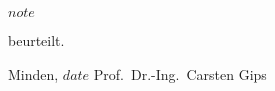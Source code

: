 
\parindent=0pt
\begin{center}
    \textbf{$note$}
\end{center}

\parindent=0pt
beurteilt.

\bigskip
\bigskip
\parindent=0pt
Minden, $date$\newline
Prof.~Dr.-Ing.~Carsten Gips\newline






